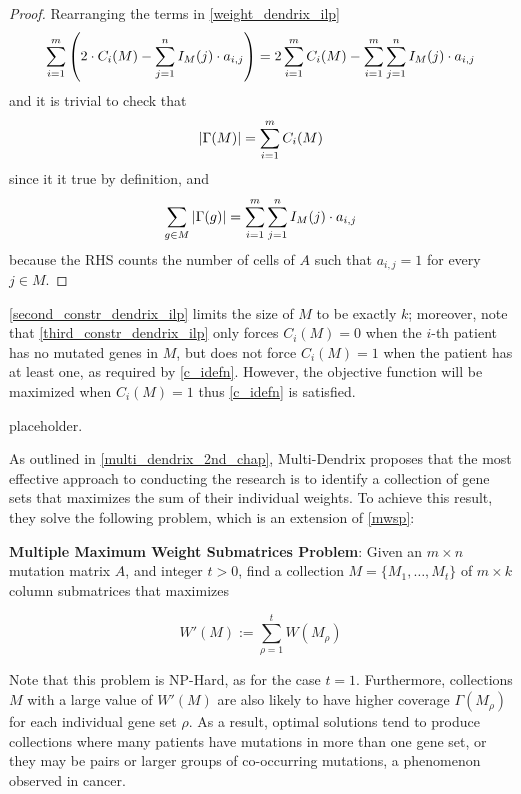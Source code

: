 \begin{proof}
    Rearranging the terms in \cref{weight_dendrix_ilp} $$\sum_{i = 1}^m {\left(2 \cdot C_i(M) - \sum_{j = 1}^n I_M(j) \cdot a_{i, j}\right)} = 2\sum_{i = 1}^m {C_i(M)} - \sum_{i = 1}^m {\sum_{j = 1}^n {I_M(j) \cdot a_{i, j}}}$$ and it is trivial to check that $$\left|\Gamma(M)\right| = \sum_{i = 1}^m {C_i(M)}$$ since it it true by definition, and $$\sum_{g \in M}{\left|\Gamma(g)\right|} = \sum_{i = 1}^m {\sum_{j = 1}^n {I_M(j) \cdot a_{i, j}}}$$ because the RHS counts the number of cells of $A$ such that $a_{i, j} = 1$ for every $j \in M$.
\end{proof}

\cref{second_constr_dendrix_ilp} limits the size of $M$ to be exactly $k$; moreover, note that \cref{third_constr_dendrix_ilp} only forces $C_i(M) = 0$ when the $i$-th patient has no mutated genes in $M$, but does not force $C_i(M) = 1$ when the patient has at least one, as required by \cref{c_idefn}. However, the objective function will be maximized when $C_i(M)=1$ thus \cref{c_idefn} is satisfied.

placeholder. 

As outlined in \cref{multi_dendrix_2nd_chap}, Multi-Dendrix proposes that the most effective approach to conducting the research is to identify a collection of gene sets that maximizes the sum of their individual weights. To achieve this result, they solve the following problem, which is an extension of \cref{mwsp}:

\begin{displayquote}
    \textbf{Multiple Maximum Weight Submatrices Problem}: Given an $m \times n$ mutation matrix $A$, and integer $t > 0$, find a collection $M = \{M_1, \ldots, M_t\}$ of $m \times k$  column submatrices that maximizes

    \begin{equation}
        W'(M) := \sum_{\rho = 1}^t {W(M_\rho)}
    \end{equation}
\end{displayquote}

Note that this problem is NP-Hard, as for the case $t = 1$. Furthermore, collections $M$ with a large value of $W'(M)$ are also likely to have higher coverage $\Gamma(M_\rho)$ for each individual gene set $\rho$. As a result, optimal solutions tend to produce collections where many patients have mutations in more than one gene set, or they may be pairs or larger groups of co-occurring mutations, a phenomenon observed in cancer. 

